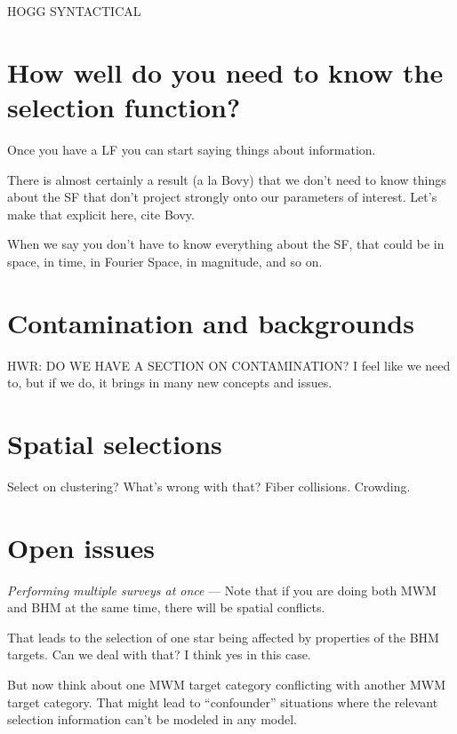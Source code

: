 \documentclass[modern]{aastex62}
\renewcommand{\paragraph}[1]{\smallskip\noindent\textit{#1} --- }
\begin{document}
HOGG SYNTACTICAL

\section{How well do you need to know the selection function?}\label{sec:quality}

Once you have a LF you can start saying things about information.

There is almost certainly a result (a la Bovy) that we don't need to know
things about the SF that don't project strongly onto our parameters of interest.
Let's make that explicit here, cite Bovy.

When we say you don't have to know everything about the SF, that could be
in space, in time, in Fourier Space, in magnitude, and so on.

\section{Contamination and backgrounds}\label{sec:bg}

HWR: DO WE HAVE A SECTION ON CONTAMINATION? I feel like we need to,
but if we do, it brings in many new concepts and issues.

\section{Spatial selections}

Select on clustering? What's wrong with that? Fiber collisions. Crowding.

\section{Open issues}

\paragraph{Performing multiple surveys at once}
Note that if you are doing both MWM and BHM at the same time, there will be
spatial conflicts.

That leads to the selection of one star being affected by properties of the
BHM targets. Can we deal with that? I think yes in this case.

But now think about one MWM target category conflicting with another MWM target
category. That might lead to ``confounder'' situations where the relevant selection
information can't be modeled in any model.
\end{document}
